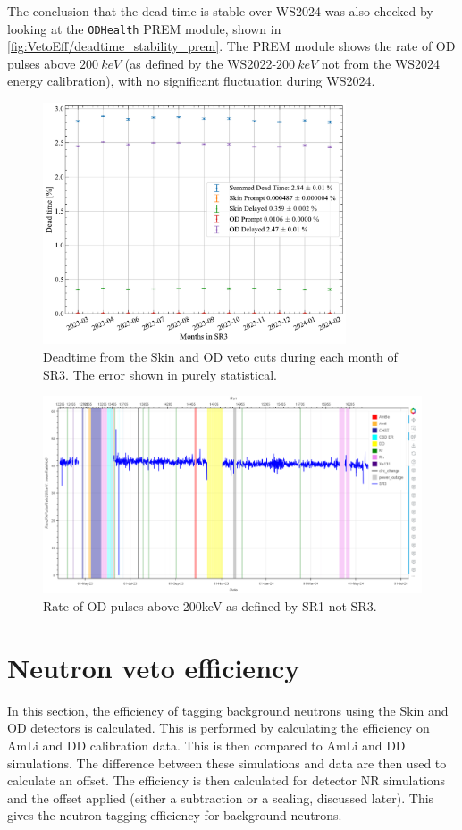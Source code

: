 The conclusion that the dead-time is stable over WS2024 was also checked by looking at the \lstinline{ODHealth} PREM module, shown in \autoref{fig:VetoEff/deadtime_stability_prem}.
The PREM module shows the rate of OD pulses above $200~keV$ (as defined by the WS2022-$200~keV$ not from the WS2024 energy calibration), with no significant fluctuation during WS2024.
\begin{figure}
	\centering
	\includegraphics[width=0.8\textwidth]{figures/VetoEfficiency/SR3DeadTimeAll_expoFunc.pdf}
	\caption{Deadtime from the Skin and OD veto cuts during each month of SR3. The error shown in purely statistical.}
	\label{fig:VetoEff/deadtime_stability}
\end{figure}
\begin{figure}
	\centering
	\includegraphics[width=\textwidth]{figures/VetoEfficiency/prem_od_stability.png}
	\caption{Rate of OD pulses above 200keV as defined by SR1 not SR3.}
	\label{fig:VetoEff/deadtime_stability_prem}
\end{figure}

\section{Neutron veto efficiency}\label{sec:Veto/efficiency}
In this section, the efficiency of tagging background neutrons using the Skin and OD detectors is calculated.
This is performed by calculating the efficiency on AmLi and DD calibration data.
This is then compared to AmLi and DD simulations.
The difference between these simulations and data are then used to calculate an offset.
The efficiency is then calculated for detector NR simulations and the offset applied (either a subtraction or a scaling, discussed later).
This gives the neutron tagging efficiency for background neutrons.

